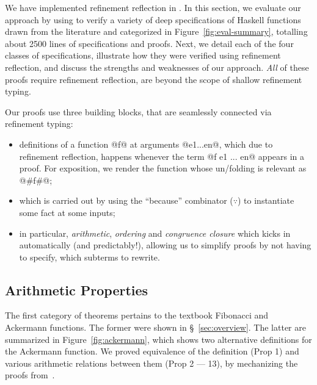 We have implemented refinement reflection
in \toolname. 
%
In this section, we evaluate our approach
by using \toolname to verify a variety of
deep specifications of Haskell functions
drawn from the literature and categorized
in Figure~\ref{fig:eval-summary},
totalling about 2500 lines of specifications
and proofs.
%
Next, we detail each of the four classes of
specifications, illustrate how they were
verified using refinement reflection, and
discuss the strengths and weaknesses of
our approach.
%
\emph{All} of these proofs require refinement
reflection, \ie are beyond the scope of shallow
refinement typing.

%
Our proofs use three building blocks, that are seamlessly
connected via refinement typing:
%
\begin{itemize}
  \item {}
     definitions of a function @f@ at
     arguments @e1...en@, which due
     to refinement reflection, happens
     whenever the term @f e1 ... en@
     appears in a proof.
     For exposition, we render the function
     whose un/folding is relevant as @#f#@;

  \item {}
     which is carried out by using
     the ``because'' combinator
     ($\because$) to instantiate
     some fact at some inputs;

  \item {}
     in particular, \emph{arithmetic},
     \emph{ordering} and \emph{congruence closure}
     which kicks in automatically (and predictably!),
     allowing us to simplify proofs by not
     having to specify, \eg which subterms
     to rewrite.
\end{itemize}

\subsection{Arithmetic Properties} \label{subsec:arith} \label{subsec:ackermann}

The first category of theorems pertains to the textbook
Fibonacci and Ackermann functions.
%
The former were shown in \S~\ref{sec:overview}.
%
The latter are summarized in Figure~\ref{fig:ackermann},
which shows two alternative definitions for the
Ackermann function.
%
We proved equivalence of the definition (Prop 1)
and various arithmetic relations between
them (Prop 2 --- 13), by mechanizing the
proofs from~\cite{ackermann}.

